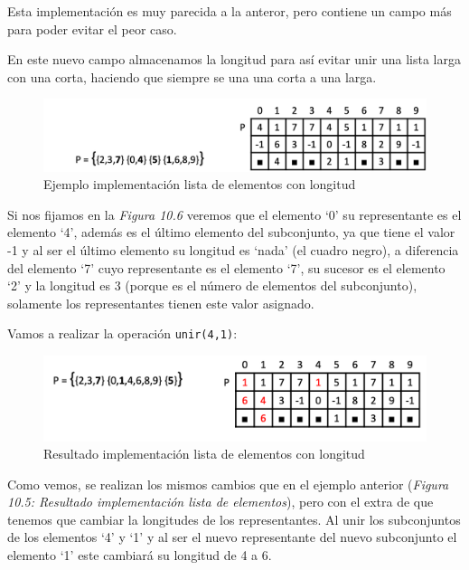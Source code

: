 Esta implementación es muy parecida a la anteror, pero contiene un campo más para poder evitar el peor caso.

En este nuevo campo almacenamos la longitud para así evitar unir una lista larga con una corta, haciendo que siempre se una una corta a una larga.

\begin{figure}[h]
  \begin{center}
    \includegraphics[width=\textwidth]{assets/impPAR5.png}
  \end{center}
  \caption{Ejemplo implementación lista de elementos con longitud}
\end{figure}

Si nos fijamos en la \textit{Figura 10.6} veremos que el elemento `0' su representante es el elemento `4', además es el último elemento del subconjunto, ya que tiene el valor -1 y al ser el último elemento su longitud es `nada' (el cuadro negro), a diferencia del elemento `7' cuyo representante es el elemento `7', su sucesor es el elemento `2' y la longitud es 3 (porque es el número de elementos del subconjunto), solamente los representantes tienen este valor asignado.

Vamos a realizar la operación \texttt{unir(4,1)}:

\begin{figure}[h]
  \begin{center}
    \includegraphics[width=\textwidth]{assets/impPAR6.png}
  \end{center}
  \caption{Resultado implementación lista de elementos con longitud}
\end{figure}

Como vemos, se realizan los mismos cambios que en el ejemplo anterior (\textit{Figura 10.5: Resultado implementación lista de elementos}), pero con el extra de que tenemos que cambiar la longitudes de los representantes.
Al unir los subconjuntos de los elementos `4' y `1' y al ser el nuevo representante del nuevo subconjunto el elemento `1' este cambiará su longitud de 4 a 6.

